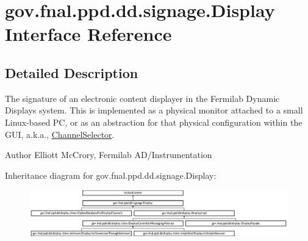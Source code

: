 \hypertarget{interfacegov_1_1fnal_1_1ppd_1_1dd_1_1signage_1_1Display}{\section{gov.\-fnal.\-ppd.\-dd.\-signage.\-Display Interface Reference}
\label{interfacegov_1_1fnal_1_1ppd_1_1dd_1_1signage_1_1Display}
}


\subsection{Detailed Description}
The signature of an electronic content displayer in the Fermilab Dynamic Displays system. This is implemented as a physical monitor attached to a small Linux-\/based P\-C, or as an abstraction for that physical configuration within the G\-U\-I, a.\-k.\-a., \hyperlink{classgov_1_1fnal_1_1ppd_1_1dd_1_1ChannelSelector}{Channel\-Selector}.

\begin{DoxyAuthor}{Author}
Elliott Mc\-Crory, Fermilab A\-D/\-Instrumentation 
\end{DoxyAuthor}
Inheritance diagram for gov.\-fnal.\-ppd.\-dd.\-signage.\-Display\-:\begin{figure}[H]
\begin{center}
\leavevmode
\includegraphics[height=2.015839cm]{interfacegov_1_1fnal_1_1ppd_1_1dd_1_1signage_1_1Display}
\end{center}
\end{figure}
